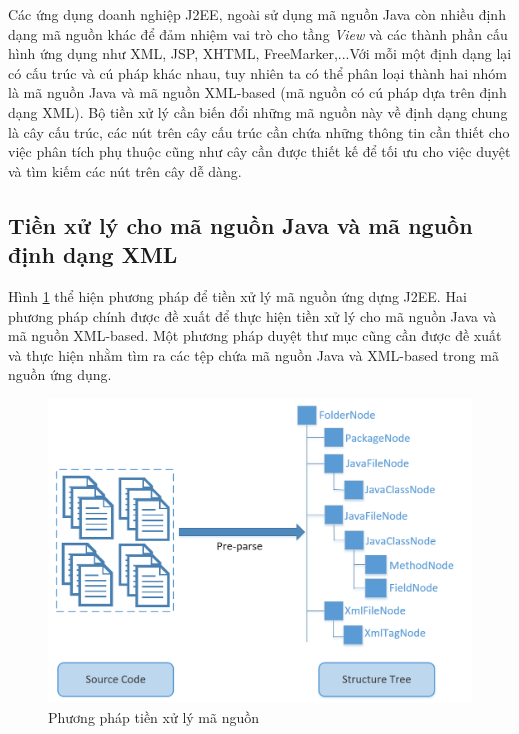 \documentclass[12pt]{report}
\begin{document}
Các ứng dụng doanh nghiệp J2EE, ngoài sử dụng mã nguồn Java còn nhiều định dạng mã nguồn khác để đảm nhiệm vai trò cho tầng \textit{View} và các thành phần cấu hình ứng dụng như XML, JSP, XHTML, FreeMarker,...Với mỗi một định dạng lại có cấu trúc và cú pháp khác nhau, tuy nhiên ta có thể phân loại thành hai nhóm là mã nguồn Java và mã nguồn XML-based (mã nguồn có cú pháp dựa trên định dạng XML). Bộ tiền xử lý cần biến đổi những mã nguồn này về định dạng chung là cây cấu trúc, các nút trên cây cấu trúc cần chứa những thông tin cần thiết cho việc phân tích phụ thuộc cũng như cây cần được thiết kế để tối ưu cho việc duyệt và tìm kiếm các nút trên cây dễ dàng.

\subsection{Tiền xử lý cho mã nguồn Java và mã nguồn định dạng XML}
Hình \ref{fig:preprocess} thể hiện phương pháp để tiền xử lý mã nguồn ứng dựng J2EE. Hai phương pháp chính được đề xuất để thực hiện tiền xử lý cho mã nguồn Java và mã nguồn XML-based. Một phương pháp duyệt thư mục cũng cần được đề xuất và thực hiện nhằm tìm ra các tệp chứa mã nguồn Java và XML-based trong mã nguồn ứng dụng.

\begin{figure}[h]
	\centering
	\includegraphics[scale=0.5]{preprocess}
	\caption{Phương pháp tiền xử lý mã nguồn}
	\label{fig:preprocess}
\end{figure}
\end{document}
